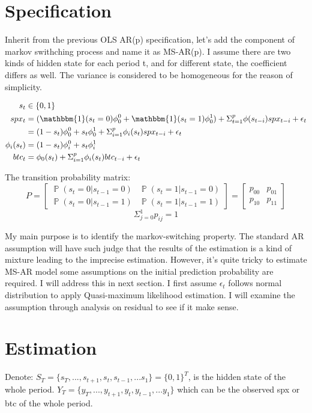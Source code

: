 \documentclass{article}
\DeclareMathOperator{\Prob}{\mathbb{P}}
\begin{document}
\newpage

\section{Specification}
Inherit from the previous OLS AR(p) specification, let's add the component of markov 
swithching process and name it as MS-AR(p). I assume there are two kinds of 
hidden state for each period t, 
and for different state, the coefficient differs as well. The variance is considered
to be homogeneous for the reason of simplicity.

\begin{align}
  s_t &\in \{ 0, 1 \} \\
  spx_t &= (\mathbbm{1}(s_t = 0)\phi_0^0 + \mathbbm{1}(s_t = 1)\phi_0^1) + \Sigma_{t=1}^p \phi(s_{t-i})spx_{t-i} +\epsilon_t \\
        &= (1-s_t)\phi_0^0 + s_t\phi_0^1 + \Sigma_{i=1}^p \phi_i(s_t)spx_{t-i} +\epsilon_t \\
  \phi_i(s_t) &= (1-s_t)\phi_i^0 + s_t\phi_i^1 \\
  btc_t &= \phi_0(s_t) + \Sigma_{i=1}^p \phi_i(s_t)btc_{t-i} +\epsilon_t
\end{align}

The transition probability matrix:
$$
P =    
\begin{bmatrix}
 \Prob(s_t=0 | s_{t-1}=0) & \Prob(s_t=1 | s_{t-1}=0)  \\
  \Prob(s_t=0 | s_{t-1}=1) & \Prob(s_t=1 | s_{t-1}=1)
\end{bmatrix}
=\begin{bmatrix}
  p_{00} & p_{01}  \\
  p_{10} & p_{11}
 \end{bmatrix}
$$
$$
\Sigma_{j=0}^1 p_{ij} = 1
$$

My main purpose is to identify the markov-switching property. The standard AR
assumption will have such judge that the results of the estimation is a kind of mixture 
leading to the imprecise estimation.
However, it's quite tricky to estimate MS-AR model some assumptions on the 
initial prediction probability are required. I will address this in next section.
I first assume $\epsilon_t$ follows normal 
distribution to apply Quasi-maximum likelihood estimation. I will examine the assumption
through analysis on residual to see if it make sense.


\section{Estimation}
Denote: $S_T = \{s_T, ..., s_{t+1}, s_t, s_{t-1}, ...s_1\} = \{0, 1\}^T$, 
is the hidden state of the whole period. $Y_T = \{y_T, ..., y_{t+1}, y_t, y_{t-1}, ...y_1\}$ 
which can be the observed spx or btc of the whole period.
\end{document}
